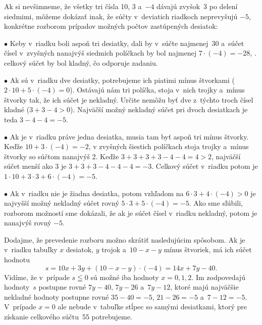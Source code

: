 {\Jres
Ak si nevšimneme, že všetky tri čísla 10, 3 a~${-4}$ dávajú
zvyšok~3 po delení siedmimi, môžeme dokázať inak, že súčty v~deviatich
riadkoch neprevyšujú ${-5}$, konkrétne rozborom prípadov možných
počtov zastúpených desiatok:
\item{$\bullet$} Keby v~riadku boli aspoň tri desiatky, dali by v~súčte najmenej~30 a~súčet čísel v~zvyšných nanajvýš siedmich políčkach by bol najmenej $7\cdot(-4)=-28$, \tj. celkový súčet by bol kladný, čo odporuje zadaniu.
\item{$\bullet$} Ak sú v~riadku dve desiatky, potrebujeme ich  piatimi mínus štvorkami ($2\cdot10+5\cdot({-4})=0$). Ostávajú nám tri políčka, stoja v~nich trojky a~mínus štvorky tak, že ich súčet je nekladný. Určite nemôžu byť dve z~týchto troch čísel kladné ($3+3-4>0$). Najväčší možný nekladný súčet pri dvoch desiatkach je teda ${3-4-4={-5}}$.
\item{$\bullet$} Ak je v~riadku práve jedna desiatka, musia tam byť aspoň tri mínus štvorky. Keďže $10+3\cdot({-4})={-2}$, v zvyšných šiestich políčkach stoja trojky a~mínus štvorky so súčtom nanajvýš 2. Keďže $3+3+3+3-4-4=4>2$, najväčší súčet menší ako 3 je $3+3+3-4-4-4=-3$. Celkový súčet v~riadku potom je $1\cdot 10+3\cdot 3+{6\cdot({-4})}={-5}$.
\item{$\bullet$} Ak v~riadku nie je žiadna desiatka, potom vzhľadom na $6\cdot3+4\cdot({-4})>0$ je najvyšší možný nekladný súčet rovný $5\cdot3+5\cdot({-4})={-5}$.
\endgraf\noindent
Ako sme sľúbili, rozborom možností sme dokázali, že ak je
súčet čísel v~riadku nekladný, potom je nanajvýš rovný ${-5}$.

Dodajme, že prevedenie rozboru možno skrátiť nasledujúcim spôsobom.
Ak je v~riadku tabuľky $x$ desiatok, $y$ trojok a~$10-x-y$ mínus
štvoriek, má ich súčet hodnotu
$$
s=10x+3y+(10-x-y)\cdot({-4})=14x+7y-40.
$$
Vidíme, že v~prípade $s\leqq0$ sú možné iba hodnoty $x=0,1,2$. Im
zodpovedajú hodnoty~$s$ postupne rovné $7y-40$, $7y-26$ a~$7y-12$,
ktoré majú najväčšie nekladné hodnoty postupne rovné $35-40={-5}$,
$21-26={-5}$ a~$7-12={-5}$. V~prípade $x=0$ ale nebude v~tabuľke
stĺpec so samými desiatkami, ktorý pre získanie celkového
súčtu~55 potrebujeme.

}
